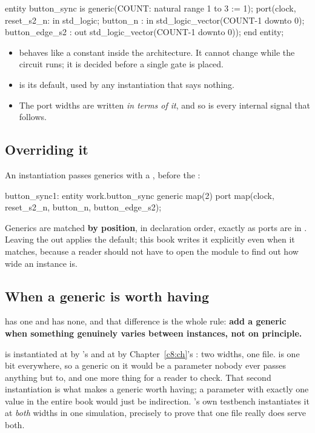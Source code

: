 \begin{vhdlcode}
entity button_sync is
    generic(COUNT: natural range 1 to 3 := 1);
    port(clock, reset_s2_n: in  std_logic;
         button_n         : in  std_logic_vector(COUNT-1 downto 0);
         button_edge_s2   : out std_logic_vector(COUNT-1 downto 0));
end entity;
\end{vhdlcode}

\begin{itemize}
  \item {} behaves like a constant inside the architecture. It cannot change while the
    circuit runs; it is decided before a single gate is placed.
  \item {} is its default, used by any instantiation that says nothing.
  \item The port widths are written \emph{in terms of it}, and so is every internal signal that
    follows.
\end{itemize}

\subsection{Overriding it}
\label{c4:override}
An instantiation passes generics with a , before the :

\begin{vhdlcode}
button_sync1: entity work.button_sync
    generic map(2)
    port map(clock, reset_s2_n, button_n, button_edge_s2);
\end{vhdlcode}

\noindent Generics are matched \textbf{by position}, in declaration order, exactly as ports are in
. Leaving the  out applies the default; this book writes it
explicitly even when it matches, because a reader should not have to open the module to find out
how wide an instance is.

\subsection{When a generic is worth having}
\label{c4:genericworth}
 has one and  has none, and that difference is the whole rule:
\textbf{add a generic when something genuinely varies between instances, not on principle.}

 is instantiated at  by 's 
and at  by Chapter~\ref{c8:ch}'s : two widths, one file.
 is one bit everywhere, so a  generic on it would be a parameter nobody
ever passes anything but  to, and one more thing for a reader to check. That second
instantiation is what makes a generic worth having; a parameter with exactly one value in the
entire book would just be indirection. 's own testbench instantiates it at
\emph{both} widths in one simulation, precisely to prove that one file really does serve both.

